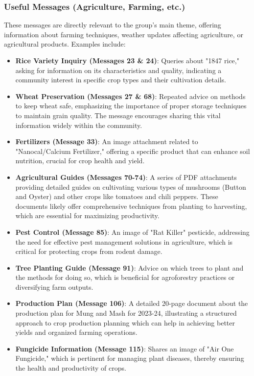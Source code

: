 \documentclass[12pt]{article}
\begin{document}
\subsubsection{Useful Messages (Agriculture, Farming, etc.)}
These messages are directly relevant to the group's main theme, offering information about farming techniques, weather updates affecting agriculture, or agricultural products. Examples include:
\begin{itemize}
  \item \textbf{Rice Variety Inquiry (Messages 23 \& 24)}: Queries about "1847 rice," asking for information on its characteristics and quality, indicating a community interest in specific crop types and their cultivation details.
  \item \textbf{Wheat Preservation (Messages 27 \& 68)}: Repeated advice on methods to keep wheat safe, emphasizing the importance of proper storage techniques to maintain grain quality. The message encourages sharing this vital information widely within the community.
  \item \textbf{Fertilizers (Message 33)}: An image attachment related to "Nanocal/Calcium Fertilizer," offering a specific product that can enhance soil nutrition, crucial for crop health and yield.
  \item \textbf{Agricultural Guides (Messages 70-74)}: A series of PDF attachments providing detailed guides on cultivating various types of mushrooms (Button and Oyster) and other crops like tomatoes and chili peppers. These documents likely offer comprehensive techniques from planting to harvesting, which are essential for maximizing productivity.
  \item \textbf{Pest Control (Message 85)}: An image of "Rat Killer" pesticide, addressing the need for effective pest management solutions in agriculture, which is critical for protecting crops from rodent damage.
  \item \textbf{Tree Planting Guide (Message 91)}: Advice on which trees to plant and the methods for doing so, which is beneficial for agroforestry practices or diversifying farm outputs.
  \item \textbf{Production Plan (Message 106)}: A detailed 20-page document about the production plan for Mung and Mash for 2023-24, illustrating a structured approach to crop production planning which can help in achieving better yields and organized farming operations.
  \item \textbf{Fungicide Information (Message 115)}: Shares an image of "Air One Fungicide," which is pertinent for managing plant diseases, thereby ensuring the health and productivity of crops.
\end{itemize}
\end{document}
